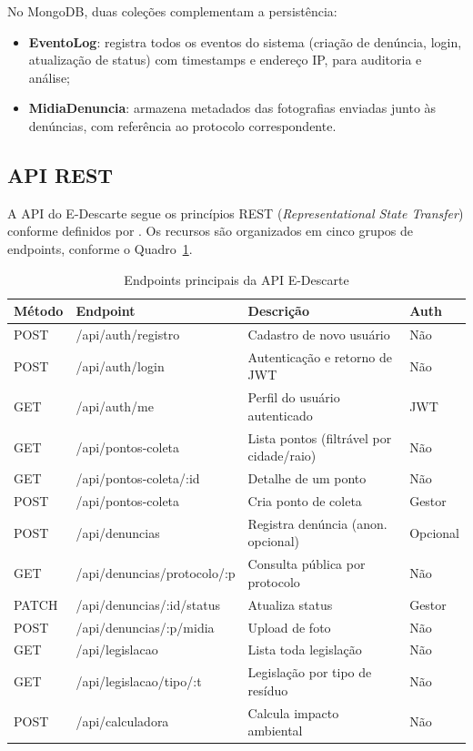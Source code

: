 \documentclass[12pt, a4paper]{article}
\numberwithin{equation}{section}
\numberwithin{figure}{section}
\numberwithin{table}{section}
\begin{document}
No MongoDB, duas coleções complementam a persistência:

\begin{itemize}
  \item \textbf{EventoLog}: registra todos os eventos do sistema (criação de
        denúncia, login, atualização de status) com timestamps e endereço IP,
        para auditoria e análise;
  \item \textbf{MidiaDenuncia}: armazena metadados das fotografias enviadas
        junto às denúncias, com referência ao protocolo correspondente.
\end{itemize}

\subsection{API REST}

A API do E-Descarte segue os princípios REST (\textit{Representational State
Transfer}) conforme definidos por . Os recursos são
organizados em cinco grupos de endpoints, conforme o Quadro~\ref{quad:endpoints}.

\begin{table}[H]
  \centering
  \caption{Endpoints principais da API E-Descarte}
  \label{quad:endpoints}
  \begin{tabularx}{\textwidth}{|l|l|X|l|}
    \hline
    \textbf{Método} & \textbf{Endpoint} & \textbf{Descrição} & \textbf{Auth} \\
    \hline
    POST & /api/auth/registro      & Cadastro de novo usuário & Não \\
    POST & /api/auth/login         & Autenticação e retorno de JWT & Não \\
    GET  & /api/auth/me            & Perfil do usuário autenticado & JWT \\
    \hline
    GET  & /api/pontos-coleta      & Lista pontos (filtrável por cidade/raio) & Não \\
    GET  & /api/pontos-coleta/:id  & Detalhe de um ponto & Não \\
    POST & /api/pontos-coleta      & Cria ponto de coleta & Gestor \\
    \hline
    POST & /api/denuncias          & Registra denúncia (anon. opcional) & Opcional \\
    GET  & /api/denuncias/protocolo/:p & Consulta pública por protocolo & Não \\
    PATCH& /api/denuncias/:id/status & Atualiza status & Gestor \\
    POST & /api/denuncias/:p/midia & Upload de foto & Não \\
    \hline
    GET  & /api/legislacao         & Lista toda legislação & Não \\
    GET  & /api/legislacao/tipo/:t & Legislação por tipo de resíduo & Não \\
    \hline
    POST & /api/calculadora        & Calcula impacto ambiental & Não \\
    \hline
  \end{tabularx}
\end{table}
\end{document}
